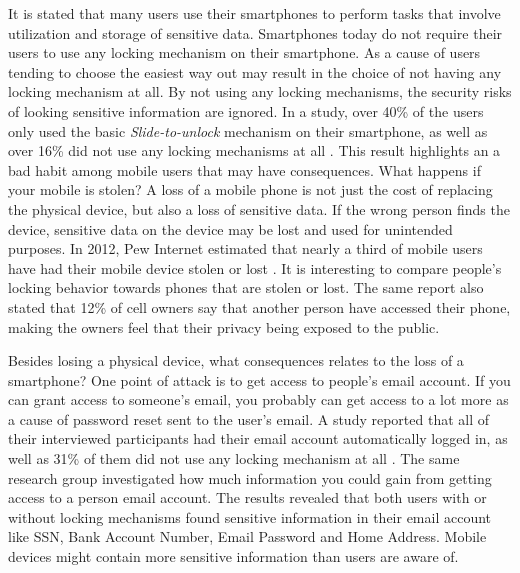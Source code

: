   It is stated that many users use their smartphones to perform tasks that involve utilization and storage of sensitive data. Smartphones today do not require their users to use any locking mechanism on their smartphone. As a cause of users tending to choose the easiest way out may result in the choice of not having any locking mechanism at all. By not using any locking mechanisms, the security risks of looking sensitive information are ignored. In a study, over 40\% of the users only used the basic {\it Slide-to-unlock} mechanism on their smartphone, as well as over 16\% did not use any locking mechanisms at all \cite{habits3}. This result highlights an a bad habit among mobile users that may have consequences. What happens if your mobile is stolen? A loss of a mobile phone is not just the cost of replacing the physical device, but also a loss of sensitive data. If the wrong person finds the device, sensitive data on the device may be lost and used for unintended purposes. In 2012, Pew Internet estimated that nearly a third of mobile users have had their mobile device stolen or lost \cite{StolenLost}. It is interesting to compare people's locking behavior towards phones that are stolen or lost. The same report also stated that 12\% of cell owners say that another person have accessed their phone, making the owners feel that their privacy being exposed to the public.

  Besides losing a physical device, what consequences relates to the loss of a smartphone? One point of attack is to get access to people's email account. If you can grant access to someone's email, you probably can get access to a lot more as a cause of password reset sent to the user's email. A study reported that all of their interviewed participants had their email account automatically logged in, as well as 31\% of them did not use any locking mechanism at all \cite{Egelman}. The same research group investigated how much information you could gain from getting access to a person email account. The results revealed that both users with or without locking mechanisms found sensitive information in their email account like SSN, Bank Account Number, Email Password and Home Address. Mobile devices might contain more sensitive information than users are aware of.
